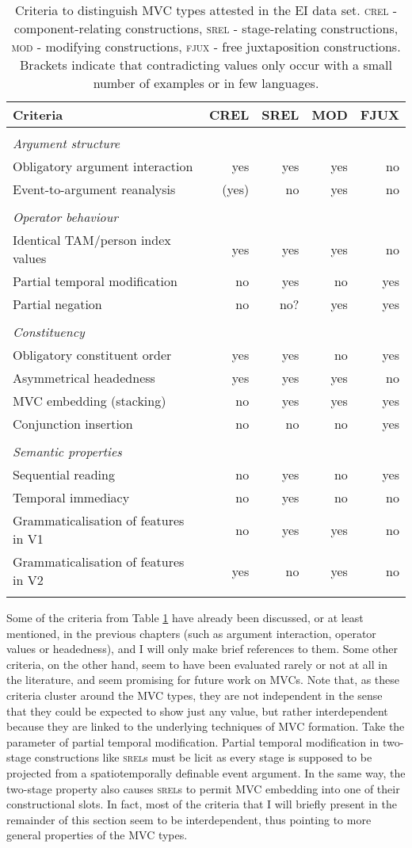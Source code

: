 \begin{table}


\begin{tabular}{lrrrr}
\lsptoprule
Criteria&CREL&SREL&MOD&FJUX\tabularnewline
\hline
\tabularnewline
\textit{Argument structure}& & & & \tabularnewline
Obligatory argument interaction&yes&yes&yes&no\tabularnewline
Event-to-argument reanalysis&(yes)&no&yes&no\tabularnewline\tabularnewline
\textit{Operator behaviour}& & & & \tabularnewline
Identical TAM/person index values&yes&yes&yes&no\tabularnewline
Partial temporal modification&no&yes&no&yes\tabularnewline
Partial negation&no&no?&yes&yes\tabularnewline\tabularnewline
\textit{Constituency}& & & & \tabularnewline
Obligatory constituent order&yes&yes&no&yes\tabularnewline
Asymmetrical headedness&yes&yes&yes&no\tabularnewline
MVC embedding (stacking)&no&yes&yes&yes\tabularnewline
Conjunction insertion&no&no&no&yes\tabularnewline\tabularnewline
\textit{Semantic properties}& & & & \tabularnewline
Sequential reading&no&yes&no&yes\tabularnewline
Temporal immediacy&no&yes&no&no\tabularnewline
Grammaticalisation of features in V1&no&yes&yes&no\tabularnewline
Grammaticalisation of features in V2&yes&no&yes&no\tabularnewline
\tabularnewline
\hline
\end{tabular}
\caption[Criteria to distinguish MVC types]{Criteria to distinguish MVC types attested in the EI data set. \textsc{crel} - component-relating constructions, \textsc{srel} - stage-relating constructions, \textsc{mod} - modifying constructions, \textsc{fjux} - free juxtaposition constructions. Brackets indicate that contradicting values only occur with a small number of examples or in few languages.}
\label{table:criteriaconstruction}
\end{table}


Some of the criteria from Table \ref{table:criteriaconstruction} have already been discussed, or at least mentioned, in the previous chapters (such as argument interaction, operator values or headedness), and I will only make brief references to them. Some other criteria, on the other hand, seem to have been evaluated rarely or not at all in the literature, and seem promising for future work on MVCs. Note that, as these criteria cluster around the MVC types, they are not independent in the sense that they could be expected to show just any value, but rather interdependent because they are linked to the underlying techniques of MVC formation. Take the parameter of partial temporal modification. Partial temporal modification in two-stage constructions like \textsc{srel}s must be licit as every stage is supposed to be projected from a spatiotemporally definable event argument. In the same way, the two-stage property also causes \textsc{srel}s to permit MVC embedding into one of their constructional slots. In fact, most of the criteria that I will briefly present in the remainder of this section seem to be interdependent, thus pointing to more general properties of the MVC types.

